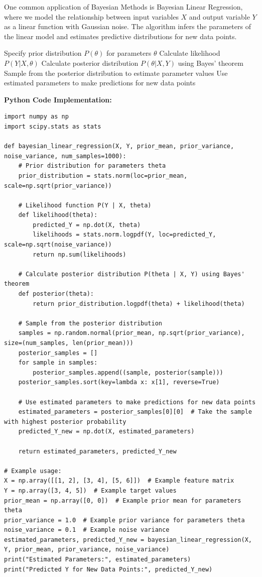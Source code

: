 \documentclass[12pt]{book} %
\begin{document}
One common application of Bayesian Methods is Bayesian Linear Regression, where we model the relationship between input variables \(X\) and output variable \(Y\) as a linear function with Gaussian noise. The algorithm infers the parameters of the linear model and estimates predictive distributions for new data points.
\FloatBarrier
\begin{algorithm}[H]
\caption{Bayesian Linear Regression}
\begin{algorithmic}[1]
\State Specify prior distribution $P(\theta)$ for parameters $\theta$
\State Calculate likelihood $P(Y | X, \theta)$
\State Calculate posterior distribution $P(\theta | X, Y)$ using Bayes' theorem
\State Sample from the posterior distribution to estimate parameter values
\State Use estimated parameters to make predictions for new data points
\end{algorithmic}
\end{algorithm}
\FloatBarrier
\textbf{Python Code Implementation:}
\FloatBarrier
\begin{lstlisting}
import numpy as np
import scipy.stats as stats

def bayesian_linear_regression(X, Y, prior_mean, prior_variance, noise_variance, num_samples=1000):
    # Prior distribution for parameters theta
    prior_distribution = stats.norm(loc=prior_mean, scale=np.sqrt(prior_variance))
    
    # Likelihood function P(Y | X, theta)
    def likelihood(theta):
        predicted_Y = np.dot(X, theta)
        likelihoods = stats.norm.logpdf(Y, loc=predicted_Y, scale=np.sqrt(noise_variance))
        return np.sum(likelihoods)
    
    # Calculate posterior distribution P(theta | X, Y) using Bayes' theorem
    def posterior(theta):
        return prior_distribution.logpdf(theta) + likelihood(theta)
    
    # Sample from the posterior distribution
    samples = np.random.normal(prior_mean, np.sqrt(prior_variance), size=(num_samples, len(prior_mean)))
    posterior_samples = []
    for sample in samples:
        posterior_samples.append((sample, posterior(sample)))
    posterior_samples.sort(key=lambda x: x[1], reverse=True)
    
    # Use estimated parameters to make predictions for new data points
    estimated_parameters = posterior_samples[0][0]  # Take the sample with highest posterior probability
    predicted_Y_new = np.dot(X, estimated_parameters)
    
    return estimated_parameters, predicted_Y_new

# Example usage:
X = np.array([[1, 2], [3, 4], [5, 6]])  # Example feature matrix
Y = np.array([3, 4, 5])  # Example target values
prior_mean = np.array([0, 0])  # Example prior mean for parameters theta
prior_variance = 1.0  # Example prior variance for parameters theta
noise_variance = 0.1  # Example noise variance
estimated_parameters, predicted_Y_new = bayesian_linear_regression(X, Y, prior_mean, prior_variance, noise_variance)
print("Estimated Parameters:", estimated_parameters)
print("Predicted Y for New Data Points:", predicted_Y_new)
\end{lstlisting}
\FloatBarrier
\end{document}
